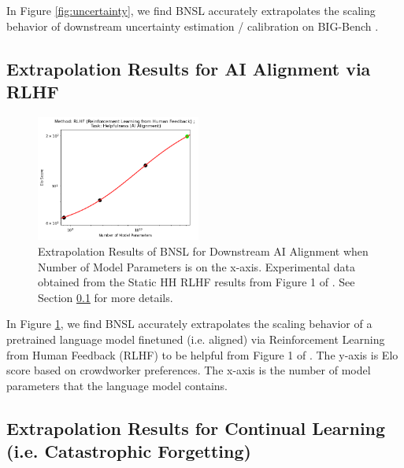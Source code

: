 \documentclass{article} %
\begin{document}
In Figure \ref{fig:uncertainty}, we find BNSL accurately extrapolates the scaling behavior of downstream uncertainty estimation / calibration on BIG-Bench \citep{srivastava2022beyond}.

\clearpage

\subsection{Extrapolation Results for AI Alignment via RLHF}
\label{section:ai_alignment}

\begin{figure}[htbp]
    \centering
\includegraphics[width=0.48\textwidth]{figures/ai_alignment/log-log.png}
    \caption{
Extrapolation Results of BNSL for Downstream AI Alignment when Number of Model Parameters is on the x-axis. Experimental data obtained from the Static HH RLHF results from Figure 1 of \cite{bai2022training}. See Section \ref{section:ai_alignment} for more details.
    }
    \label{fig:ai_alignment}
\end{figure}

In Figure \ref{fig:ai_alignment}, we find BNSL accurately extrapolates the scaling behavior of a pretrained language model finetuned (i.e. aligned) via Reinforcement Learning from Human Feedback (RLHF) to be helpful from Figure 1 of \cite{bai2022training}. The y-axis is Elo score based on crowdworker preferences. The x-axis is the number of model parameters that the language model contains.

\vspace{5.0mm}

\subsection{Extrapolation Results for Continual Learning (i.e. Catastrophic Forgetting)}
\label{section:continual}
\end{document}
